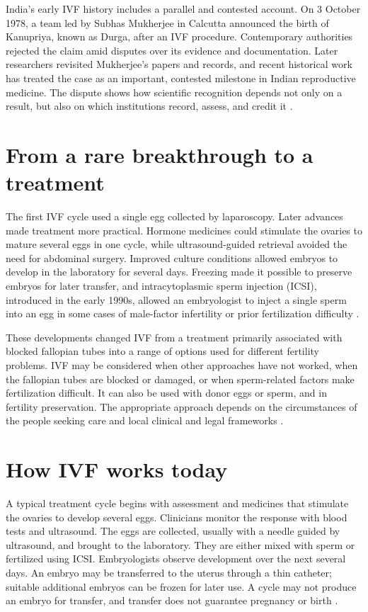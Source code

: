 \documentclass[12pt,oneside]{book}
\begin{document}
India's early IVF history includes a parallel and contested account. On
3 October 1978, a team led by Subhas Mukherjee in Calcutta announced the
birth of Kanupriya, known as Durga, after an IVF procedure. Contemporary
authorities rejected the claim amid disputes over its evidence and
documentation. Later researchers revisited Mukherjee's papers and records,
and recent historical work has treated the case as an important, contested
milestone in Indian reproductive medicine. The dispute shows how scientific
recognition depends not only on a result, but also on which institutions
record, assess, and credit it \cite{indiaIVFContested,indiaIVFArchive}.

\section{From a rare breakthrough to a treatment}
The first IVF cycle used a single egg collected by laparoscopy. Later
advances made treatment more practical. Hormone medicines could stimulate
the ovaries to mature several eggs in one cycle, while ultrasound-guided
retrieval avoided the need for abdominal surgery. Improved culture
conditions allowed embryos to develop in the laboratory for several days.
Freezing made it possible to preserve embryos for later transfer, and
intracytoplasmic sperm injection (ICSI), introduced in the early 1990s,
allowed an embryologist to inject a single sperm into an egg in some cases
of male-factor infertility or prior fertilization difficulty
\cite{ivfHistoryReview,asrmReproductiveHistory}.

These developments changed IVF from a treatment primarily associated with
blocked fallopian tubes into a range of options used for different fertility
problems. IVF may be considered when other approaches have not worked, when
the fallopian tubes are blocked or damaged, or when sperm-related factors
make fertilization difficult. It can also be used with donor eggs or sperm,
and in fertility preservation. The appropriate approach depends on the
circumstances of the people seeking care and local clinical and legal
frameworks \cite{hfeaIVF}.

\section{How IVF works today}
A typical treatment cycle begins with assessment and medicines that
stimulate the ovaries to develop several eggs. Clinicians monitor the
response with blood tests and ultrasound. The eggs are collected, usually
with a needle guided by ultrasound, and brought to the laboratory. They are
either mixed with sperm or fertilized using ICSI. Embryologists observe
development over the next several days. An embryo may be transferred to the
uterus through a thin catheter; suitable additional embryos can be frozen
for later use. A cycle may not produce an embryo for transfer, and transfer
does not guarantee pregnancy or birth \cite{hfeaIVF}.
\end{document}
